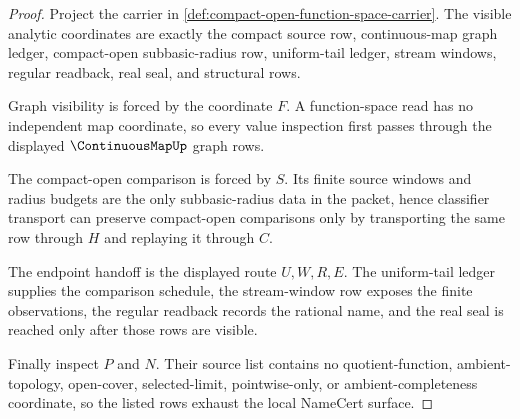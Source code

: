 \begin{proof}
Project the carrier in \autoref{def:compact-open-function-space-carrier}. The visible analytic coordinates are exactly the compact source row, continuous-map graph ledger, compact-open subbasic-radius row, uniform-tail ledger, stream windows, regular readback, real seal, and structural rows.

Graph visibility is forced by the coordinate $F$. A function-space read has no independent map coordinate, so every value inspection first passes through the displayed $\ContinuousMapUp$ graph rows.

The compact-open comparison is forced by $S$. Its finite source windows and radius budgets are the only subbasic-radius data in the packet, hence classifier transport can preserve compact-open comparisons only by transporting the same row through $H$ and replaying it through $C$.

The endpoint handoff is the displayed route $U,W,R,E$. The uniform-tail ledger supplies the comparison schedule, the stream-window row exposes the finite observations, the regular readback records the rational name, and the real seal is reached only after those rows are visible.

Finally inspect $P$ and $N$. Their source list contains no quotient-function, ambient-topology, open-cover, selected-limit, pointwise-only, or ambient-completeness coordinate, so the listed rows exhaust the local NameCert surface.
\end{proof}

